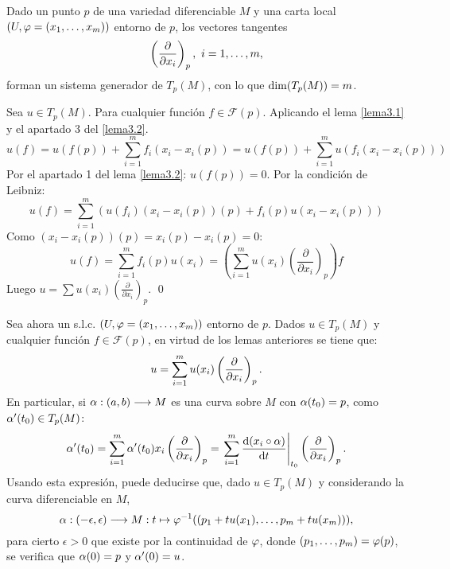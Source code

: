 \documentclass[Cursovd_portada.tex]{subfiles}
\begin{document}
\begin{lemma}\label{lema3.3}
Dado un punto $p$ de una variedad diferenciable $M$ y una carta local $(U,\varphi=(x_1,\dots ,x_m))$ entorno de $p$,
los vectores tangentes
$$\left(\displaystyle{\frac{\partial}{\partial x_i}}\right)_p,\mbox{ }i=1,\dots ,m,$$
forman un sistema generador de $T_p(M)$, con lo que ${\rm dim}(T_p(M))=m$.
\end{lemma}
\begin{dem}
Sea $u \in T_p(M)$. Para cualquier función $f \in \mathcal{F}(p)$. Aplicando el lema \ref{lema3.1} y el apartado 3 del \ref{lema3.2}.
\[ u(f) = u(f(p))+\sum_{i=1}^m f_i(x_i-x_i(p)) = u(f(p)) + \sum_{i=1}^m u(f_i(x_i-x_i(p))) \]
Por el apartado 1 del lema \ref{lema3.2}: $u(f(p))=0$. Por la condición de Leibniz:
\[ u(f) = \sum_{i=1}^m ( u(f_i)(x_i-x_i(p))(p) + f_i(p) u(x_i-x_i(p))) \]
Como $(x_i-x_i(p))(p)=x_i(p)-x_i(p)=0$:
\[ u(f) = \sum_{i=1}^m f_i(p) u(x_i) = \left(\sum_{i=1}^m u(x_i) \left(\frac{\partial}{\partial x_i}\right)_p\right)f \]
Luego $u = \sum u(x_i) \left(\frac{\partial}{\partial x_i}\right)_p$.
\qed
\end{dem}
Sea ahora un s.l.c. $(U,\varphi=(x_1,\dots ,x_m))$ entorno de $p$. Dados $u\in T_p(M)$ y cualquier función
$f\in\mathcal{F}(p)$, en virtud de los lemas anteriores se tiene que:
$$u=\sum_{i=1}^mu(x_i)\left(\displaystyle{\frac{\partial}{\partial x_i}}\right)_p.$$
\hs En particular, si $\alpha:(a,b)\longrightarrow M$ es una curva sobre $M$ con $\alpha(t_0)=p$, como $\alpha'(t_0)\in T_p(M)$:
$$\alpha'(t_0)=\sum_{i=1}^m\alpha'(t_0)x_i\left(\displaystyle{\frac{\partial}{\partial x_i}}\right)_p=
\left.\sum_{i=1}^m\displaystyle{\frac{{\rm d} (x_i\circ\alpha)}{{\rm d} t}}\right|_{t_0}\left(\displaystyle{\frac{\partial}{\partial x_i}}\right)_p.$$ \hs Usando esta expresión, puede
deducirse que, dado $u\in T_p(M)$ y considerando la curva diferenciable en $M$,
$$\alpha:(-\epsilon,\epsilon)\longrightarrow M:t\mapsto \varphi^{-1}((p_1+tu(x_1),\dots ,p_m+tu(x_m))),$$
para cierto $\epsilon>0$ que existe por la continuidad de $\varphi$, donde $(p_1,\dots ,p_m)=\varphi(p)$, se verifica que
$\alpha(0)=p$ y $\alpha'(0)=u$.
\end{document}
